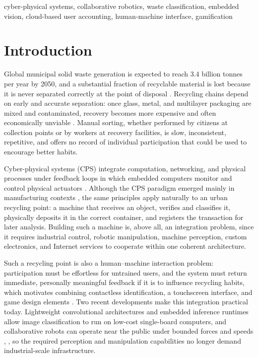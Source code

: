 ﻿\documentclass[conference]{IEEEtran}
\begin{document}
\begin{IEEEkeywords}
cyber-physical systems, collaborative robotics, waste classification, embedded vision, cloud-based user accounting, human-machine interface, gamification
\end{IEEEkeywords}

\section{Introduction}
Global municipal solid waste generation is expected to reach 3.4 billion tonnes per year by 2050, and a substantial fraction of recyclable material is lost because it is never separated correctly at the point of disposal \cite{b1}. Recycling chains depend on early and accurate separation: once glass, metal, and multilayer packaging are mixed and contaminated, recovery becomes more expensive and often economically unviable \cite{b1}. Manual sorting, whether performed by citizens at collection points or by workers at recovery facilities, is slow, inconsistent, repetitive, and offers no record of individual participation that could be used to encourage better habits.

Cyber-physical systems (CPS) integrate computation, networking, and physical processes under feedback loops in which embedded computers monitor and control physical actuators \cite{b2}. Although the CPS paradigm emerged mainly in manufacturing contexts \cite{b3}, the same principles apply naturally to an urban recycling point: a machine that receives an object, verifies and classifies it, physically deposits it in the correct container, and registers the transaction for later analysis. Building such a machine is, above all, an integration problem, since it requires industrial control, robotic manipulation, machine perception, custom electronics, and Internet services to cooperate within one coherent architecture.

Such a recycling point is also a human--machine interaction problem: participation must be effortless for untrained users, and the system must return immediate, personally meaningful feedback if it is to influence recycling habits, which motivates combining contactless identification, a touchscreen interface, and game design elements \cite{b12}. Two recent developments make this integration practical today. Lightweight convolutional architectures \cite{b7} and embedded inference runtimes \cite{b9} allow image classification to run on low-cost single-board computers, and collaborative robots can operate near the public under bounded forces and speeds \cite{b10}, \cite{b11}, so the required perception and manipulation capabilities no longer demand industrial-scale infrastructure.
\end{document}
